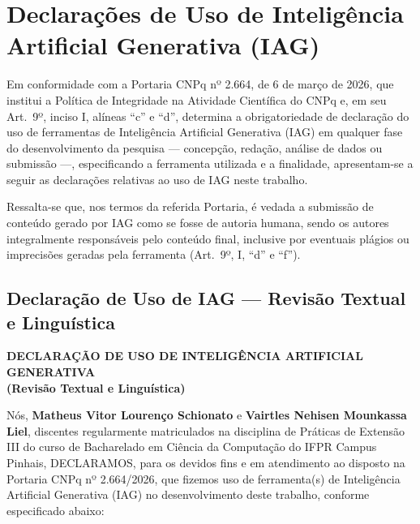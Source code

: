 
\chapter{Declarações de Uso de Inteligência Artificial Generativa (IAG)}
\label{apendice_declaracao_iag}

\noindent
Em conformidade com a Portaria CNPq nº 2.664, de 6 de março de 2026, que institui a
Política de Integridade na Atividade Científica do CNPq e, em seu Art.~9º, inciso I,
alíneas ``c'' e ``d'', determina a obrigatoriedade de declaração do uso de ferramentas
de Inteligência Artificial Generativa (IAG) em qualquer fase do desenvolvimento da
pesquisa --- concepção, redação, análise de dados ou submissão ---, especificando a
ferramenta utilizada e a finalidade, apresentam-se a seguir as declarações relativas
ao uso de IAG neste trabalho.

\bigskip
\noindent
Ressalta-se que, nos termos da referida Portaria, é vedada a submissão de conteúdo
gerado por IAG como se fosse de autoria humana, sendo os autores integralmente
responsáveis pelo conteúdo final, inclusive por eventuais plágios ou imprecisões
geradas pela ferramenta (Art.~9º, I, ``d'' e ``f'').


\section{Declaração de Uso de IAG --- Revisão Textual e Linguística}
\label{ap:declaracao_revisao_texto}

\begin{center}
\textbf{\large DECLARAÇÃO DE USO DE INTELIGÊNCIA ARTIFICIAL GENERATIVA}\\
\textbf{(Revisão Textual e Linguística)}
\end{center}

\bigskip
\noindent
Nós, \textbf{Matheus Vitor Lourenço Schionato} e \textbf{Vairtles Nehisen Mounkassa Liel}, discentes regularmente matriculados na disciplina de Práticas de Extensão III do curso de Bacharelado em Ciência da Computação do IFPR Campus Pinhais, DECLARAMOS, para os devidos fins e em atendimento ao disposto na Portaria CNPq nº 2.664/2026, que fizemos uso de ferramenta(s) de Inteligência Artificial Generativa (IAG) no desenvolvimento deste trabalho, conforme especificado abaixo:

